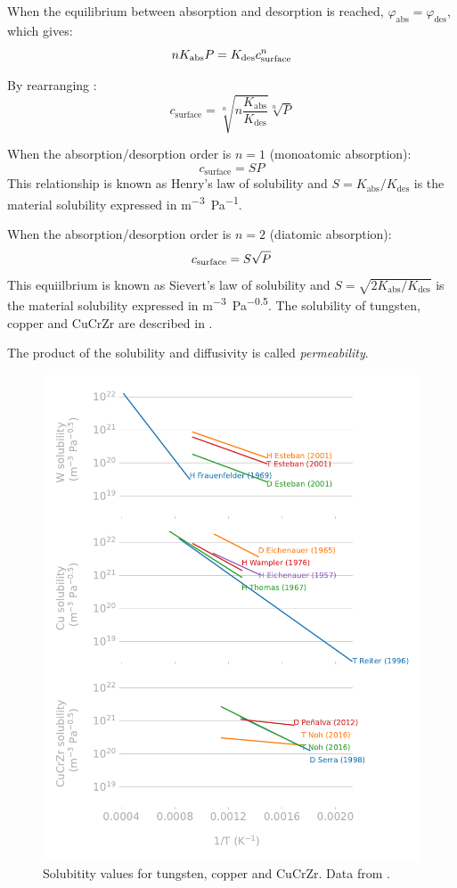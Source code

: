 When the equilibrium between absorption and desorption is reached, $\varphi_\mathrm{abs} = \varphi_\mathrm{des}$, which gives:
\begin{equation}
    n K_\mathrm{abs} P = K_\mathrm{des} c_\mathrm{surface}^n
    \labeq{equilibrium absorption desorption}
\end{equation}

By rearranging :
\begin{equation}
    c_\mathrm{surface} = \sqrt[n]{n \frac{K_\mathrm{abs}}{K_\mathrm{des}}} \sqrt[n]{P}
\end{equation}

When the absorption/desorption order is $n=1$ (monoatomic absorption):
\begin{equation}
    c_\mathrm{surface} = S P
\end{equation}
This relationship is known as Henry's law of solubility and $S = K_\mathrm{abs}/K_\mathrm{des}$ is the material solubility expressed in \si{m^{-3}.Pa^{-1}}.

When the absorption/desorption order is $n=2$ (diatomic absorption):
\begin{equation}
    c_\mathrm{surface} = S \sqrt{P}
    \labeq{sievert's law}
\end{equation}
This equiilbrium is known as Sievert's law of solubility and $S = \sqrt{2 K_\mathrm{abs}/K_\mathrm{des}}$ is the material solubility expressed in \si{m^{-3}.Pa^{-0.5}}.
The solubility of tungsten, copper and CuCrZr are described in .

The product of the solubility and diffusivity is called \textit{permeability}.

\begin{figure}
    \centering
    \includegraphics[width=0.75\linewidth]{Figures/Chapter1/materials_solubility_review_comparison.pdf}
    \caption{Solubitity values for tungsten, copper and CuCrZr. Data from \cite{delaporte-mathurin_remdelaportemathurinh-transport-materials_2022}.}
\end{figure}

